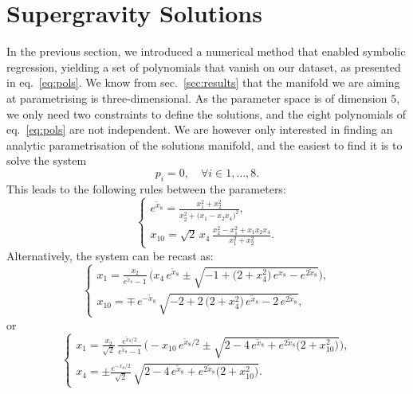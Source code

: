 \documentclass[11pt,a4paper]{article}
\begin{document}
\section{Supergravity Solutions} \label{sec:sugrasol}
In the previous section, we introduced a numerical method that enabled symbolic regression, yielding a set of polynomials that vanish on our dataset, as presented in eq.~\eqref{eq:pols}. We know from sec.~\ref{sec:results} that the manifold we are aiming at parametrising is three-dimensional. As the parameter space is of dimension $5$, we only need two constraints to define the solutions, and the eight polynomials of eq.~\eqref{eq:pols} are not independent. We are however only interested in finding an analytic parametrisation of the solutions manifold, and the easiest to find it is to solve the system
	\begin{equation}\label{eq:solvepol}
		p_i = 0, \quad \forall i \in {1,\dots,8}.
	\end{equation}
	This leads to the following rules between the parameters:
	\begin{equation}\label{eq:rulex8x10}
		\begin{cases}
			\displaystyle e^{\tilde{x}_{8}} = \frac{x_{1}^{2}+x_{2}^{2}}{x_{2}^{2} + \big(x_{1}-x_{2}x_{4}\big)^{2}},\\[10pt]
			\displaystyle x_{10} = \sqrt{2}\,x_{4}\,\frac{x_{2}^{2} - x_{1}^{2}+x_{1}x_{2}x_{4}}{x_{1}^{2}+x_{2}^{2}}.
		\end{cases}
	\end{equation}
	Alternatively, the system can be recast as:
	\begin{equation}
		\begin{cases}
			\displaystyle x_{1} = \frac{x_{2}}{e^{\tilde{x}_{8}}-1}\,\Big(x_{4}\,e^{\tilde{x}_{8}} \pm \sqrt{-1+\big(2+x_{4}^{2}\big)\,e^{x_{8}}-e^{2\tilde{x}_{8}}}\Big),\\[8pt]
			\displaystyle x_{10} = \mp\,e^{-\tilde{x}_{8}}\,\sqrt{-2+2\,\big(2+x_{4}^{2}\big)\,e^{\tilde{x}_{8}}-2\,e^{2\tilde{x}_{8}}},
		\end{cases}
	\end{equation}
	or
	\begin{equation}
		\begin{cases}
			\displaystyle x_{1} = \frac{x_{2}}{\sqrt{2}}\,\frac{e^{\tilde{x}_{8}/2}}{e^{\tilde{x}_{8}}-1}\,\Big(-x_{10}\,e^{\tilde{x}_{8}/2} \pm \sqrt{2-4\,e^{\tilde{x}_{8}}+e^{2\tilde{x}_{8}}\big(2+x_{10}^{2}\big)}\Big),\\[8pt]
			\displaystyle x_{4} = \pm \frac{e^{-x_{8}/2}}{\sqrt{2}}\,\sqrt{2-4\,e^{\tilde{x}_{8}}+e^{2\tilde{x}_{8}}\big(2+x_{10}^{2}\big)}.
		\end{cases}
	\end{equation}
\end{document}
